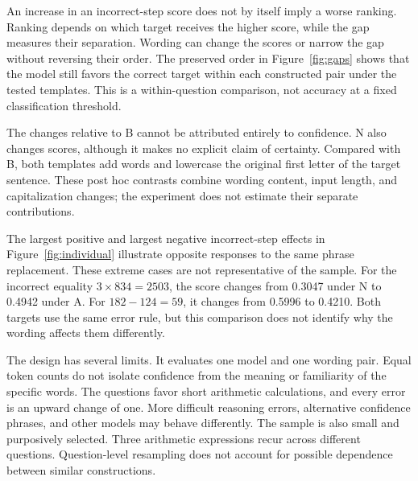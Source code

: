 An increase in an incorrect-step score does not by itself imply a worse ranking. Ranking depends on which target receives the higher score, while the gap measures their separation. Wording can change the scores or narrow the gap without reversing their order. The preserved order in Figure~\ref{fig:gaps} shows that the model still favors the correct target within each constructed pair under the tested templates. This is a within-question comparison, not accuracy at a fixed classification threshold.

The changes relative to B cannot be attributed entirely to confidence. N also changes scores, although it makes no explicit claim of certainty. Compared with B, both templates add words and lowercase the original first letter of the target sentence. These post hoc contrasts combine wording content, input length, and capitalization changes; the experiment does not estimate their separate contributions.

The largest positive and largest negative incorrect-step effects in Figure~\ref{fig:individual} illustrate opposite responses to the same phrase replacement. These extreme cases are not representative of the sample. For the incorrect equality $3 \times 834 = 2503$, the score changes from 0.3047 under N to 0.4942 under A. For $182 - 124 = 59$, it changes from 0.5996 to 0.4210. Both targets use the same error rule, but this comparison does not identify why the wording affects them differently.

The design has several limits. It evaluates one model and one wording pair. Equal token counts do not isolate confidence from the meaning or familiarity of the specific words. The questions favor short arithmetic calculations, and every error is an upward change of one. More difficult reasoning errors, alternative confidence phrases, and other models may behave differently. The sample is also small and purposively selected. Three arithmetic expressions recur across different questions. Question-level resampling does not account for possible dependence between similar constructions.
